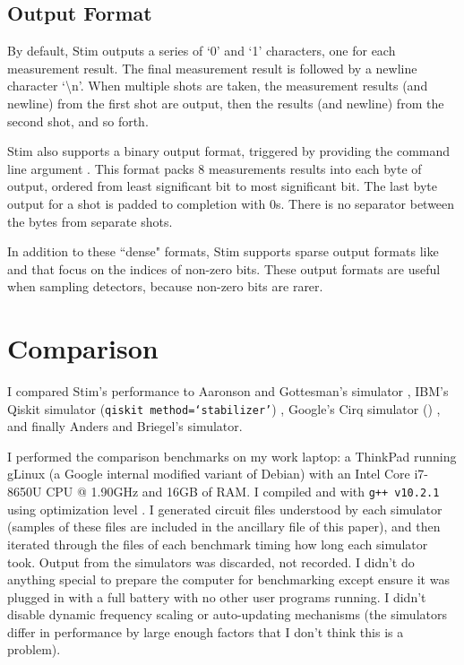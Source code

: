 \documentclass[onecolumn,unpublished]{quantumarticle}
\theoremstyle{definition}
\theoremstyle{definition}
\theoremstyle{definition}
\begin{document}
\subsection{Output Format}

By default, Stim outputs a series of `0' and `1' characters, one for each measurement result.
The final measurement result is followed by a newline character `\textbackslash n'.
When multiple shots are taken, the measurement results (and newline) from the first shot are output, then the results (and newline) from the second shot, and so forth.

Stim also supports a binary output format, triggered by providing the command line argument .
This format packs 8 measurements results into each byte of output, ordered from least significant bit to most significant bit.
The last byte output for a shot is padded to completion with 0s.
There is no separator between the bytes from separate shots.

In addition to these ``dense" formats, Stim supports sparse output formats like  and  that focus on the indices of non-zero bits.
These output formats are useful when sampling detectors, because non-zero bits are rarer.


\section{Comparison}
\label{sec:compare}

I compared Stim's performance to Aaronson and Gottesman's  simulator \cite{aaronson2004chp}, IBM's Qiskit simulator (\texttt{qiskit method=`stabilizer'}) \cite{Qiskit}, Google's Cirq simulator () \cite{quantum_ai_team_and_collaborators_2020_4062499}, and finally Anders and Briegel's  \cite{anders2006fastgraphsim} simulator.

I performed the comparison benchmarks on my work laptop: a ThinkPad running gLinux (a Google internal modified variant of Debian) with an Intel Core i7-8650U CPU @ 1.90GHz and 16GB of RAM.
I compiled  and  with \texttt{g++ v10.2.1} using optimization level .
I generated circuit files understood by each simulator (samples of these files are included in the ancillary file of this paper), and then iterated through the files of each benchmark timing how long each simulator took.
Output from the simulators was discarded, not recorded.
I didn't do anything special to prepare the computer for benchmarking except ensure it was plugged in with a full battery with no other user programs running.
I didn't disable dynamic frequency scaling or auto-updating mechanisms (the simulators differ in performance by large enough factors that I don't think this is a problem).
\end{document}
